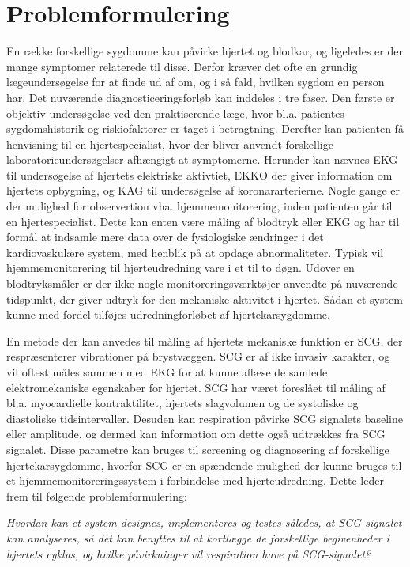 \section{Problemformulering}

En række forskellige sygdomme kan påvirke hjertet og blodkar, og ligeledes er der mange  symptomer relaterede til disse. Derfor kræver det ofte en grundig lægeundersøgelse for at finde ud af om, og i så fald, hvilken sygdom en person har. Det nuværende diagnosticeringsforløb kan inddeles i tre faser. Den første er objektiv undersøgelse ved den praktiserende læge, hvor bl.a. patientes sygdomshistorik og riskiofaktorer er taget i betragtning. Derefter kan patienten få henvisning til en hjertespecialist, hvor der bliver anvendt forskellige laboratorieundersøgelser afhængigt at symptomerne. Herunder kan nævnes EKG til undersøgelse af hjertets elektriske aktivtiet, EKKO der giver information om hjertets opbygning, og KAG til undersøgelse af koronararterierne. Nogle gange er der mulighed for observertion vha. hjemmemonitorering, inden patienten går til en hjertespecialist. Dette kan enten være måling af blodtryk eller EKG og har til formål at indsamle mere data over de fysiologiske ændringer i det kardiovaskulære system, med henblik på at opdage abnormaliteter. Typisk vil hjemmemonitorering til hjerteudredning vare i et til to døgn. Udover en blodtryksmåler er der ikke nogle monitoreringsværktøjer anvendte på nuværende tidspunkt, der giver udtryk for den mekaniske aktivitet i hjertet. Sådan et system kunne med fordel tilføjes udredningforløbet af hjertekarsygdomme. 

En metode der kan anvedes til måling af hjertets mekaniske funktion er SCG, der respræsenterer vibrationer på brystvæggen. SCG er af ikke invasiv karakter, og vil oftest måles sammen med EKG for at kunne aflæse de samlede elektromekaniske egenskaber for hjertet. SCG har været foreslået til måling af bl.a. myocardielle kontraktilitet, hjertets slagvolumen og  de systoliske og diastoliske tidsintervaller. Desuden kan respiration påvirke SCG signalets baseline eller amplitude, og dermed kan information om dette også udtrækkes fra SCG signalet. Disse parametre kan bruges til screening og diagnosering af forskellige hjertekarsygdomme, hvorfor SCG er en spændende mulighed der kunne bruges til et hjemmemonitoreringssystem i forbindelse med hjerteudredning.  Dette leder frem til følgende problemformulering: 


\begin{center}\textit{Hvordan kan et system designes, implementeres og testes således, at SCG-signalet kan  analyseres, så det kan benyttes til at kortlægge de forskellige begivenheder i hjertets cyklus, og hvilke påvirkninger vil respiration have på SCG-signalet?}\end{center}